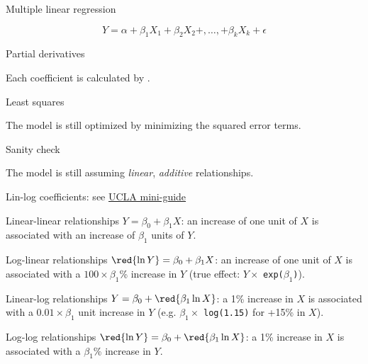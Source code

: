 \documentclass[t]{beamer}
\begin{document}
	\begin{frame}[c]{Multiple linear regression}
		
		$$Y = \alpha+\beta_1 X_1+\beta_2 X_2+,\ldots,+\beta_k X_k+\epsilon$$
		
		\vfill
		 
		\begin{block}{Partial derivatives}

			Each coefficient is calculated by .

		\end{block}

		\begin{block}{Least squares}

			The model is still optimized by minimizing the squared error terms.

		\end{block}

		\begin{alertblock}{Sanity check}

			The model is still assuming \emph{linear}, \emph{additive} relationships.

		\end{alertblock}
				
	\end{frame}


	\begin{frame}[c]{Lin-log coefficients: see \href{http://www.ats.ucla.edu/stat/mult_pkg/faq/general/log_transformed_regression.htm}{UCLA mini-guide}}
	
	\begin{block}{Linear-linear relationships}
		$Y = \beta_0 + \beta_1 X$: an increase of one unit of $X$ is associated with an increase of $\beta_1$ units of $Y$.
	\end{block}
	
	\begin{block}{Log-linear relationships}
		$\red{\ln Y} = \beta_0 + \beta_1 X$: an increase of one unit of $X$ is associated with a $100 \times \beta_1$\% increase in $Y$ (true effect: $Y \times$ \texttt{exp($\beta_1$)}).
	\end{block}

	\begin{block}{Linear-log relationships}
		$Y = \beta_0 + \red{\beta_1 \ln X}$: a 1\% increase in $X$ is associated with a $0.01 \times \beta_1$ unit increase in $Y$ (e.g. $\beta_1 \times$ \texttt{log(1.15)} for +15\% in $X$).
	\end{block}
	
	\begin{block}{Log-log relationships}
		$\red{\ln Y} = \beta_0 + \red{\beta_1 \ln X}$: a 1\% increase in $X$ is associated with a $\beta_1$\%
		increase in $Y$.
	\end{block}
	
	\end{frame}
	
\end{document}
